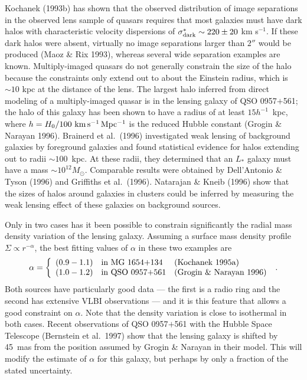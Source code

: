 \documentclass[a4paper,10pt]{article} %
\begin{document}
Kochanek (1993b) has shown that the observed distribution of image
separations in the observed lens sample of quasars requires that most
galaxies must have dark halos with characteristic velocity dispersions
of $\sigma_{\rm dark}^*\sim220\pm20$ km s$^{-1}$. If these dark halos
were absent, virtually no image separations larger than $2''$ would be
produced (Maoz \& Rix 1993), whereas several wide separation examples
are known. Multiply-imaged quasars do not generally constrain the size
of the halo because the constraints only extend out to about the
Einstein radius, which is $\sim10$ kpc at the distance of the
lens. The largest halo inferred from direct modeling of a
multiply-imaged quasar is in the lensing galaxy of QSO 0957$+$561; the
halo of this galaxy has been shown to have a radius of at least
$15h^{-1}$~kpc, where $h=H_0/100~{\rm km\,s^{-1}\,Mpc^{-1}}$ is the
reduced Hubble constant (Grogin \& Narayan 1996). Brainerd et al.\
(1996) investigated weak lensing of background galaxies by foreground
galaxies and found statistical evidence for halos extending out to
radii $\sim100$~kpc. At these radii, they determined that an $L_*$
galaxy must have a mass $\sim10^{12}M_\odot$. Comparable results were
obtained by Dell'Antonio \& Tyson (1996) and Griffiths et al.\ (1996).
Natarajan \& Kneib (1996) show that the sizes of halos around galaxies
in clusters could be inferred by measuring the weak lensing effect of
these galaxies on background sources.

Only in two cases has it been possible to constrain significantly the
radial mass density variation of the lensing galaxy. Assuming a
surface mass density profile $\Sigma\propto r^{-\alpha}$, the best
fitting values of $\alpha$ in these two examples are
\begin{equation}
  \alpha = \left\{
  \begin{array}{lll}
    (0.9-1.1) & \hbox{in MG 1654$+$134} &
    \hbox{(Kochanek 1995a)} \\
    (1.0-1.2) & \hbox{in QSO 0957$+$561} &
    \hbox{(Grogin \& Narayan 1996)} \\
  \end{array}\right.\;.
\label{eq:3.33}
\end{equation}
Both sources have particularly good data --- the first is a radio ring
and the second has extensive VLBI observations --- and it is this
feature that allows a good constraint on $\alpha$. Note that the
density variation is close to isothermal in both cases. Recent
observations of QSO 0957$+$561 with the Hubble Space Telescope
(Bernstein et al.\ 1997) show that the lensing galaxy is shifted by
45~mas from the position assumed by Grogin \& Narayan in their model.
This will modify the estimate of $\alpha$ for this galaxy, but perhaps
by only a fraction of the stated uncertainty.
\end{document}
